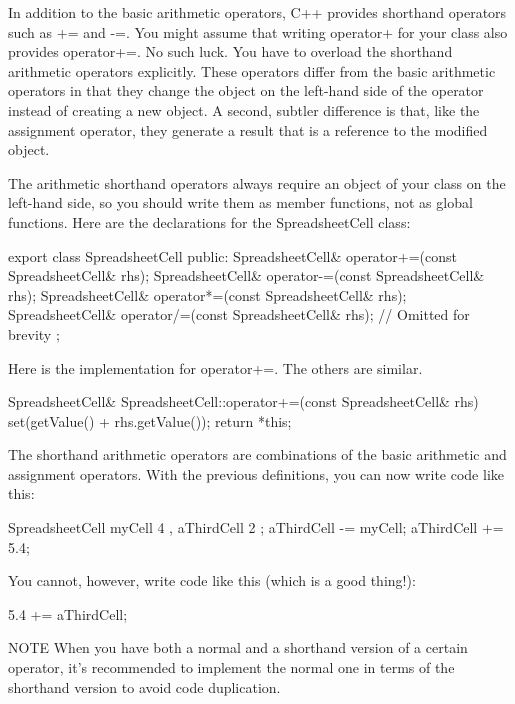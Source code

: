 In addition to the basic arithmetic operators, C++ provides shorthand operators such as += and -=. You might assume that writing operator+ for your class also provides operator+=. No such luck. You have to overload the shorthand arithmetic operators explicitly. These operators differ from the basic arithmetic operators in that they change the object on the left-hand side of the operator instead of creating a new object. A second, subtler difference is that, like the assignment operator, they generate a result that is a reference to the modified object.

The arithmetic shorthand operators always require an object of your class on the left-hand side, so you should write them as member functions, not as global functions. Here are the declarations for the SpreadsheetCell class:

\begin{cpp}
export class SpreadsheetCell
{
    public:
        SpreadsheetCell& operator+=(const SpreadsheetCell& rhs);
        SpreadsheetCell& operator-=(const SpreadsheetCell& rhs);
        SpreadsheetCell& operator*=(const SpreadsheetCell& rhs);
        SpreadsheetCell& operator/=(const SpreadsheetCell& rhs);
        // Omitted for brevity
};
\end{cpp}

Here is the implementation for operator+=. The others are similar.

\begin{cpp}
SpreadsheetCell& SpreadsheetCell::operator+=(const SpreadsheetCell& rhs)
{
    set(getValue() + rhs.getValue());
    return *this;
}
\end{cpp}

The shorthand arithmetic operators are combinations of the basic arithmetic and assignment operators. With the previous definitions, you can now write code like this:

\begin{cpp}
SpreadsheetCell myCell { 4 }, aThirdCell { 2 };
aThirdCell -= myCell;
aThirdCell += 5.4;
\end{cpp}

You cannot, however, write code like this (which is a good thing!):

\begin{cpp}
5.4 += aThirdCell;
\end{cpp}

\begin{myNotic}{NOTE}
When you have both a normal and a shorthand version of a certain operator, it’s recommended to implement the normal one in terms of the shorthand version to avoid code duplication.
\end{myNotic}

